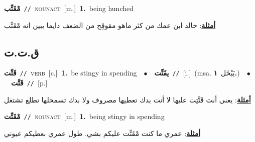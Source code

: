 \documentclass[10pt,a4paper,twoside]{article} %
\begin{document}
\begin{multicols}{2}
{{{{{{{{{{{{{{\setlength\topsep{0pt}\textbf{\foreignlanguage{arabic}{مْقَتِّب}}\ {\color{gray}\texttt{//}\color{black}}\ \textsc{noun\textunderscore act}\ [m.]\ \textbf{1.}~being hunched\  \begin{flushright}\color{gray}\foreignlanguage{arabic}{\textbf{\underline{\foreignlanguage{arabic}{أمثلة}}}: خالد ابن عمك من كثر ماهو مقوقِح من الضعف دايما ببين انه مْقَتِّب}\end{flushright}\color{black}} \vspace{2mm}

\vspace{-3mm}
\subsection*{\color{blue}\foreignlanguage{arabic}{ق.ت.ت}\color{blue}{}} 

{\setlength\topsep{0pt}\textbf{\foreignlanguage{arabic}{قَتِّت}}\ {\color{gray}\texttt{//}\color{black}}\ \textsc{verb}\ [c.]\ \textbf{1.}~be stingy in spending\ \ $\bullet$\ \ \setlength\topsep{0pt}\textbf{\foreignlanguage{arabic}{يقَتِّت}}\ {\color{gray}\texttt{//}\color{black}}\ [i.]\ \color{gray}(msa. \foreignlanguage{arabic}{يَبْخَل}~\foreignlanguage{arabic}{\textbf{١.}})\color{black}\ \ $\bullet$\ \ \setlength\topsep{0pt}\textbf{\foreignlanguage{arabic}{قَتَّت}}\ {\color{gray}\texttt{//}\color{black}}\ [p.]\  \begin{flushright}\color{gray}\foreignlanguage{arabic}{\textbf{\underline{\foreignlanguage{arabic}{أمثلة}}}: يعني أنت قَتَّتِت عليها لا أنت بدك تعطيها مصروف ولا بدك تسمحلها تطلع تشتغل}\end{flushright}\color{black}} \vspace{2mm}

{\setlength\topsep{0pt}\textbf{\foreignlanguage{arabic}{مْقَتِّت}}\ {\color{gray}\texttt{//}\color{black}}\ \textsc{noun\textunderscore act}\ [m.]\ \textbf{1.}~being stingy in spending\  \begin{flushright}\color{gray}\foreignlanguage{arabic}{\textbf{\underline{\foreignlanguage{arabic}{أمثلة}}}: عمري ما كنت مْقَتِّت عليكم بشي. طول عمري بعطيكم عيوني}\end{flushright}\color{black}} \vspace{2mm}

}}}}}}}}}}}}}
\end{multicols}
\end{document}
